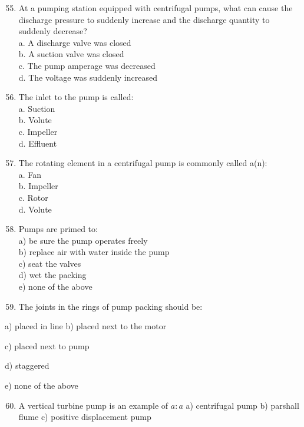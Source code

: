 \documentclass[10pt]{article}
\begin{document}
\begin{enumerate}
\begin{enumerate}
\begin{enumerate}
  \setcounter{enumi}{54}
  \item At a pumping station equipped with centrifugal pumps, what can cause the discharge pressure to suddenly increase and the discharge quantity to suddenly decrease?\\
a. A discharge valve was closed\\
b. A suction valve was closed\\
c. The pump amperage was decreased\\
d. The voltage was suddenly increased\\

  \item The inlet to the pump is called:\\
a. Suction\\
b. Volute\\
c. Impeller\\
d. Effluent\\

  \item The rotating element in a centrifugal pump is commonly called a(n):\\
a. Fan\\
b. Impeller\\
c. Rotor\\
d. Volute\\

  \item Pumps are primed to:\\
a) be sure the pump operates freely\\
b) replace air with water inside the pump\\
c) seat the valves\\
d) wet the packing\\
e) none of the above\\

  \item The joints in the rings of pump packing should be:

\end{enumerate}

a) placed in line b) placed next to the motor

c) placed next to pump

d) staggered

e) none of the above

\begin{enumerate}
  \setcounter{enumi}{59}
  \item A vertical turbine pump is an example of $a: a$ a) centrifugal pump b) parshall flume c) positive displacement pump
\end{enumerate}


\end{enumerate}
\end{enumerate}
\end{document}
